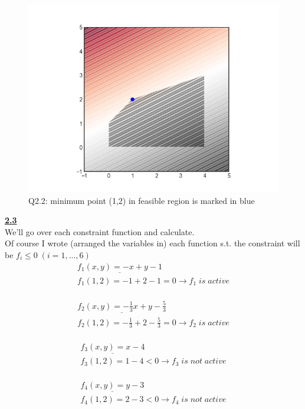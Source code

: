 \documentclass[fleqn]{article}
\begin{document}
\begin{figure}[h!]
\includegraphics[width=0.8\linewidth]{q2_2.PNG}
\caption{Q2.2: minimum point (1,2) in feasible region is marked in blue}
\end{figure}

\underline{\textbf{2.3}} \\
We'll go over each constraint function and calculate.\\
Of course I wrote (arranged the variables in) each function s.t. the constraint will be $f_i \leq 0 \; (i=1,...,6)$\\

\begin{multline*}
\underline{f_1(x,y) = -x+y-1} \\
f_1(1,2) = -1+2-1 = 0 \rightarrow \boxed{f_1 \; is \; active}
\end{multline*} \\

\begin{multline*}
\underline{f_2(x,y) = -\frac{1}{3}x+y-\frac{5}{3}} \\
f_2(1,2) = -\frac{1}{3}+2-\frac{5}{3} = 0 \rightarrow \boxed{f_2 \; is \; active}
\end{multline*} \\

\begin{multline*}
\underline{f_3(x,y) = x-4} \\
f_3(1,2) = 1-4<0 \rightarrow \boxed{f_3 \; is \; not \; active}
\end{multline*} \\

\begin{multline*}
\underline{f_4(x,y) = y-3} \\
f_4(1,2) = 2-3<0 \rightarrow \boxed{f_4 \; is \; not \; active}
\end{multline*} \\
\end{document}
